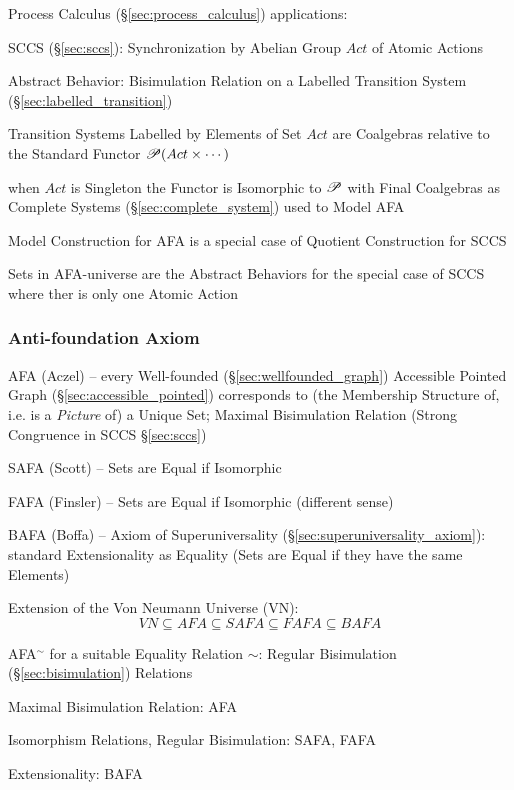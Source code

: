 Process Calculus (\S\ref{sec:process_calculus}) applications:

SCCS (\S\ref{sec:sccs}): Synchronization by Abelian Group $Act$ of
Atomic Actions

Abstract Behavior: Bisimulation Relation on a Labelled Transition
System (\S\ref{sec:labelled_transition})

Transition Systems Labelled by Elements of Set $Act$ are Coalgebras
relative to the Standard Functor $\mathscr{P}(Act \times \cdots)$

when $Act$ is Singleton the Functor is Isomorphic to $\mathscr{P}$ with Final
Coalgebras as Complete Systems (\S\ref{sec:complete_system}) used to
Model AFA

Model Construction for AFA is a special case of Quotient Construction
for SCCS

Sets in AFA-universe are the Abstract Behaviors for the special case
of SCCS where ther is only one Atomic Action



\subsubsection{Anti-foundation Axiom}\label{sec:anti_foundation}

\cite{aczel88}

AFA (Aczel) -- every Well-founded (\S\ref{sec:wellfounded_graph})
Accessible Pointed Graph (\S\ref{sec:accessible_pointed}) corresponds
to (the Membership Structure of, i.e. is a \emph{Picture} of) a Unique
Set; Maximal Bisimulation Relation (Strong Congruence in SCCS
\S\ref{sec:sccs})

SAFA (Scott) -- Sets are Equal if Isomorphic

FAFA (Finsler) -- Sets are Equal if Isomorphic (different sense)

BAFA (Boffa) -- Axiom of Superuniversality
(\S\ref{sec:superuniversality_axiom}): standard Extensionality as
Equality (Sets are Equal if they have the same Elements)

Extension of the Von Neumann Universe (VN):
\[
  VN \subseteq AFA \subseteq SAFA \subseteq FAFA \subseteq BAFA
\]

AFA$^\sim$ for a suitable Equality Relation $\sim$: Regular
Bisimulation (\S\ref{sec:bisimulation}) Relations

Maximal Bisimulation Relation: AFA

Isomorphism Relations, Regular Bisimulation: SAFA, FAFA

Extensionality: BAFA


